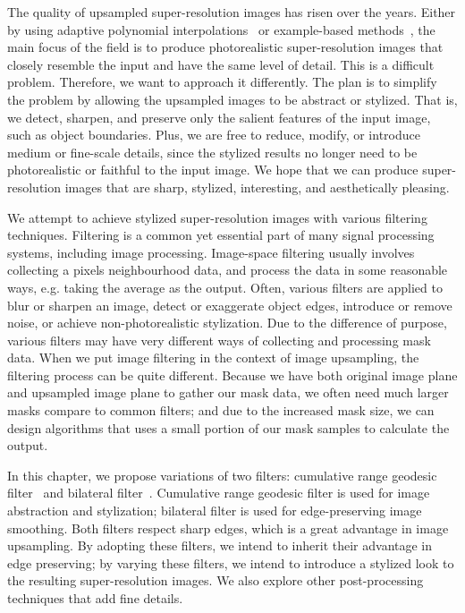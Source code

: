 The quality of upsampled super-resolution images has risen over the years. Either by using adaptive polynomial interpolations~\cite{Unser:spline,bicubic,warpeddistance,regInterpolation,adaptiveInter} or example-based methods~\cite{Freeman:pct,Kim:singlImg,Glasner:singlSup,Fattal:Hallucination,FAT:EdgeStatistics,kopf:JBilateral}, the main focus of the field is to produce photorealistic super-resolution images that closely resemble the input and have the same level of detail. This is a difficult problem. Therefore, we want to approach it differently. The plan is to simplify the problem by allowing the upsampled images to be abstract or stylized. That is, we detect, sharpen, and preserve only the salient features of the input image, such as object boundaries. Plus, we are free to reduce, modify, or introduce medium or fine-scale details, since the stylized results no longer need to be photorealistic or faithful to the input image. We hope that we can produce super-resolution images that are sharp, stylized, interesting, and aesthetically pleasing.

We attempt to achieve stylized super-resolution images with various filtering techniques. Filtering is a common yet essential part of many signal processing systems, including image processing. Image-space filtering usually involves collecting a pixel\textquotesingle s neighbourhood data, and process the data in some reasonable ways, e.g. taking the average as the output. Often, various filters are applied to blur or sharpen an image, detect or exaggerate object edges, introduce or remove noise, or achieve non-photorealistic stylization. Due to the difference of purpose, various filters may have very different ways of collecting and processing mask data. When we put image filtering in the context of image upsampling, the filtering process can be quite different. Because we have both original image plane and upsampled image plane to gather our mask data, we often need much larger masks compare to common filters; and due to the increased mask size, we can design algorithms that uses a small portion of our mask samples to calculate the output.

In this chapter, we propose variations of two filters: cumulative range geodesic filter~\cite{David:geo, Mould2} and bilateral filter~\cite{Tomasi:bilateral}. Cumulative range geodesic filter is used for image abstraction and stylization; bilateral filter is used for edge-preserving image smoothing. Both filters respect sharp edges, which is a great advantage in image upsampling. By adopting these filters, we intend to inherit their advantage in edge preserving; by varying these filters, we intend to introduce a stylized look to the resulting super-resolution images. We also explore other post-processing techniques that add fine details.

